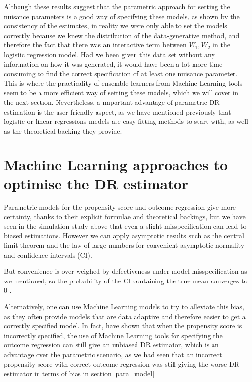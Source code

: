 \documentclass[12pt,twoside]{article}
\begin{document}
Although these results suggest that the parametric approach for setting the nuisance parameters is a good way of specifying these models, as shown by the consistency of the estimates, in reality we were only able to set the models correctly because we knew the distribution of the data-generative method, and therefore the fact that there was an interactive term between $W_1,W_2$ in the logistic regression model. Had we been given this data set without any information on how it was generated, it would have been a lot more time-consuming to find the correct specification of at least one nuisance parameter. This is where the practicality of ensemble learners from Machine Learning tools seem to be a more efficient way of setting these models, which we will cover in the next section. Nevertheless, a important advantage of parametric DR estimation is the user-friendly aspect, as we have mentioned previously that logistic or linear regressions models are easy fitting methods to start with, as well as the theoretical backing they provide.

\clearpage
\section{Machine Learning approaches to optimise the DR estimator}

Parametric models for the propensity score and outcome regression give more certainty, thanks to their explicit formulae and theoretical backings, but we have seen in the simulation study above that even a slight misspecification can lead to biased estimations. However we can apply asymptotic results such as the central limit theorem and the law of large numbers for convenient asymptotic normality and confidence intervals (CI).

But convenience is over weighed by defectiveness under model misspecification as we mentioned, so the probability of the CI containing the true mean converges to 0 \citep{diaz}.

Alternatively, one can use Machine Learning models to try to alleviate this bias, as they often provide models that are data adaptive and therefore easier to get a correctly specified model. In fact, \citet{ps_SL} have shown that when the propensity score is incorrectly specified, the use of Machine Learning tools for specifying the outcome regression can still give an unbiased DR estimator, which is an advantage over the parametric scenario, as we had seen that an incorrect propensity score with correct outcome regression was still giving the worse DR estimator in terms of bias in section \ref{para_model}.
\end{document}
